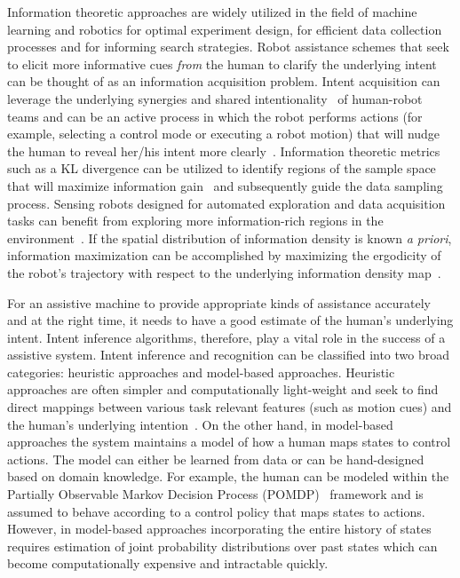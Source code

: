 \documentclass[conference]{IEEEtran}
\begin{document}
Information theoretic approaches are widely utilized in the field of machine learning and robotics for optimal experiment design, for efficient data collection processes and for informing search strategies. Robot assistance schemes that seek to elicit more informative cues \textit{from} the human to clarify the underlying intent can be thought of as an information acquisition problem. Intent acquisition can leverage the underlying synergies and shared intentionality~\citep{tomasello2007shared} of human-robot teams and can be an active process in which the robot performs actions (for example, selecting a control mode or executing a robot motion) that will nudge the human to reveal her/his intent more clearly~\cite{sadigh2016information, sadigh2016planning}. Information theoretic metrics such as a KL divergence can be utilized to identify regions of the sample space that will maximize information gain~\citep{tong2001active} and subsequently guide the data sampling process. Sensing robots designed for automated exploration and data acquisition tasks can benefit from exploring more information-rich regions in the environment~\citep{atanasov2014information}. If the spatial distribution of information density is known \textit{a priori}, information maximization can be accomplished by maximizing the ergodicity of the robot's trajectory with respect to the underlying information density map~\citep{miller2013trajectory, miller2016ergodic}. 

For an assistive machine to provide appropriate kinds of assistance accurately and at the right time, it needs to have a good estimate of the human's underlying intent. Intent inference algorithms, therefore, play a vital role in the success of a assistive system. Intent inference and recognition can be classified into two broad categories: heuristic approaches and model-based approaches. Heuristic approaches are often simpler and computationally light-weight and seek to find direct mappings between various task relevant features (such as motion cues) and the human's underlying intention~\citep{baker2007goal, baker2009action}. On the other hand, in model-based approaches the system maintains a model of how a human maps states to control actions. The model can either be learned from data or can be hand-designed based on domain knowledge. For example, the human can be modeled within the Partially Observable Markov Decision Process (POMDP)~\citep{dragan2013policy, taha2011pomdp} framework and is assumed to behave according to a control policy that maps states to actions. However, in model-based approaches incorporating the entire history of states requires estimation of joint probability distributions over past states which can become computationally expensive and intractable quickly.
\end{document}
